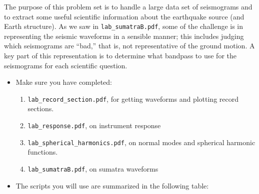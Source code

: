 \documentclass[11pt,titlepage,fleqn]{article}
\begin{document}
\begin{spacing}{1.0}

The purpose of this problem set is to handle a large data set of seismograms and to extract some useful scientific information about the earthquake source (and Earth structure). As we saw in \verb+lab_sumatraB.pdf+, some of the challenge is in representing the seismic waveforms in a sensible manner; this includes judging which seismograms are ``bad,'' that is, not representative of the ground motion. A key part of this representation is to determine what bandpass to use for the seismograms for each scientific question.

\begin{itemize}


\item Make sure you have completed:
%
\begin{enumerate}
\item \verb+lab_record_section.pdf+, for getting waveforms and plotting record sections.

\item \verb+lab_response.pdf+, on instrument response

\item \verb+lab_spherical_harmonics.pdf+, on normal modes and spherical harmonic functions.

\item \verb+lab_sumatraB.pdf+, on sumatra waveforms
\end{enumerate}


\item The scripts you will use are summarized in the following table:


\end{itemize}
\end{spacing}
\end{document}
